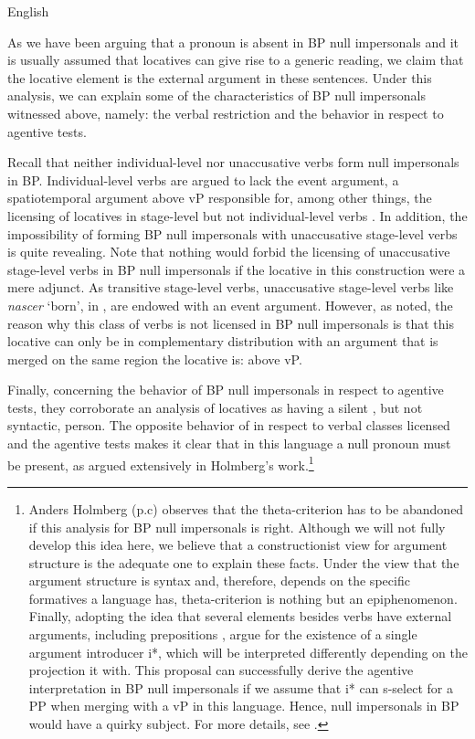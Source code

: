 \documentclass[output=paper]{LSP/langsci}
\begin{document}
\ea\label{ex:22.alexiadou}
{English}{}{\citealt[34--35]{Brody2013}}\\
\z
\z


As we have been arguing that a pronoun is absent in BP null impersonals and it is usually assumed that locatives can give rise to a generic reading, we claim that the locative element is the external argument in these sentences. Under this analysis, we can explain some of the characteristics of BP null impersonals witnessed above, namely: the verbal restriction and the behavior in respect to agentive tests.

Recall that neither individual-level nor unaccusative verbs form null impersonals in BP. Individual-level verbs are argued to lack the event argument, a spatiotemporal argument above vP responsible for, among other things, the licensing of locatives in stage-level but not individual-level verbs \citep{Kratzer1995}. In addition, the impossibility of forming BP null impersonals with unaccusative stage-level verbs is quite revealing. Note that nothing would forbid the licensing of unaccusative stage-level verbs in BP null impersonals if the locative in this construction were a mere adjunct. As transitive stage-level verbs, unaccusative stage-level verbs like \textit{nascer} `born', in , are endowed with an event argument. However, as noted, the reason why this class of verbs is not licensed in BP null impersonals is that this locative can only be in complementary distribution with an argument that is merged on the same region the locative is: above vP.


Finally, concerning the behavior of BP null impersonals in respect to agentive tests, they corroborate an analysis of locatives as having a silent , but not syntactic, person. The opposite behavior of  in respect to verbal classes licensed and the agentive tests makes it clear that in this language a null pronoun must be present, as argued extensively in Holmberg’s work.\footnote{Anders Holmberg (p.c) observes that the theta-criterion has to be abandoned if this analysis for BP null impersonals is right. Although we will not fully develop this idea here, we believe that a constructionist view for argument structure is the adequate one to explain these facts. Under the view that the argument structure is syntax and, therefore, depends on the specific formatives a language has, theta-criterion is nothing but an epiphenomenon. Finally, adopting the idea that several elements besides verbs have external arguments, including prepositions \citep{Svenonius2010}, \citet{WoodEtAl2017} argue for the existence of a single argument introducer i*, which will be interpreted differently depending on the projection it  with. This proposal can successfully derive the agentive interpretation in BP null impersonals if we assume that i* can s-select for a PP when merging with a vP in this language. Hence, null impersonals in BP would have a quirky subject. For more details, see \citet{Carvalho2016}.}
\end{document}
